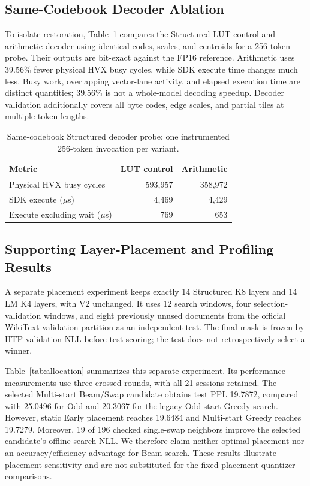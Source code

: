 \documentclass[conference,a4paper,10pt]{IEEEtran}
\begin{document}
\subsection{Same-Codebook Decoder Ablation}
To isolate restoration, Table~\ref{tab:decoder} compares the Structured LUT control and arithmetic decoder using identical codes, scales, and centroids for a 256-token probe. Their outputs are bit-exact against the FP16 reference. Arithmetic uses 39.56\% fewer physical HVX busy cycles, while SDK execute time changes much less. Busy work, overlapping vector-lane activity, and elapsed execution time are distinct quantities; 39.56\% is not a whole-model decoding speedup. Decoder validation additionally covers all byte codes, edge scales, and partial tiles at multiple token lengths.

\begin{table}[t]
\caption{Same-codebook Structured decoder probe: one instrumented 256-token invocation per variant.}
\label{tab:decoder}
\centering
\setlength{\tabcolsep}{5pt}
\begin{tabular}{@{}lrr@{}}
\toprule
Metric & LUT control & Arithmetic\\
\midrule
Physical HVX busy cycles & 593,957 & 358,972\\
SDK execute ($\mu$s) & 4,469 & 4,429\\
Execute excluding wait ($\mu$s) & 769 & 653\\
\bottomrule
\end{tabular}
\end{table}

\subsection{Supporting Layer-Placement and Profiling Results}
A separate placement experiment keeps exactly 14 Structured K8 layers and 14 LM K4 layers, with V2 unchanged. It uses 12 search windows, four selection-validation windows, and eight previously unused documents from the official WikiText validation partition as an independent test. The final mask is frozen by HTP validation NLL before test scoring; the test does not retrospectively select a winner.

Table~\ref{tab:allocation} summarizes this separate experiment. Its performance measurements use three crossed rounds, with all 21 sessions retained. The selected Multi-start Beam/Swap candidate obtains test PPL 19.7872, compared with 25.0496 for Odd and 20.3067 for the legacy Odd-start Greedy search. However, static Early placement reaches 19.6484 and Multi-start Greedy reaches 19.7279. Moreover, 19 of 196 checked single-swap neighbors improve the selected candidate's offline search NLL. We therefore claim neither optimal placement nor an accuracy/efficiency advantage for Beam search. These results illustrate placement sensitivity and are not substituted for the fixed-placement quantizer comparisons.
\end{document}
